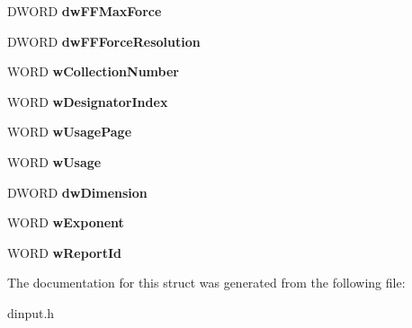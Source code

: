 \begin{DoxyCompactItemize}
\item 
\hypertarget{struct_d_i_d_e_v_i_c_e_o_b_j_e_c_t_i_n_s_t_a_n_c_e_a_a3592d183014f1c2d64ad28bdb27f88ef}{D\-W\-O\-R\-D {\bfseries dw\-F\-F\-Max\-Force}}\label{struct_d_i_d_e_v_i_c_e_o_b_j_e_c_t_i_n_s_t_a_n_c_e_a_a3592d183014f1c2d64ad28bdb27f88ef}

\item 
\hypertarget{struct_d_i_d_e_v_i_c_e_o_b_j_e_c_t_i_n_s_t_a_n_c_e_a_a09065880b51be7eb7a05149bdd096c9d}{D\-W\-O\-R\-D {\bfseries dw\-F\-F\-Force\-Resolution}}\label{struct_d_i_d_e_v_i_c_e_o_b_j_e_c_t_i_n_s_t_a_n_c_e_a_a09065880b51be7eb7a05149bdd096c9d}

\item 
\hypertarget{struct_d_i_d_e_v_i_c_e_o_b_j_e_c_t_i_n_s_t_a_n_c_e_a_af387b174698bc6f9581974e5bbb22ac8}{W\-O\-R\-D {\bfseries w\-Collection\-Number}}\label{struct_d_i_d_e_v_i_c_e_o_b_j_e_c_t_i_n_s_t_a_n_c_e_a_af387b174698bc6f9581974e5bbb22ac8}

\item 
\hypertarget{struct_d_i_d_e_v_i_c_e_o_b_j_e_c_t_i_n_s_t_a_n_c_e_a_ad8c9a9aa5493949ac085ddd966bdb5c9}{W\-O\-R\-D {\bfseries w\-Designator\-Index}}\label{struct_d_i_d_e_v_i_c_e_o_b_j_e_c_t_i_n_s_t_a_n_c_e_a_ad8c9a9aa5493949ac085ddd966bdb5c9}

\item 
\hypertarget{struct_d_i_d_e_v_i_c_e_o_b_j_e_c_t_i_n_s_t_a_n_c_e_a_a321be32a18cddc73a729e0433e529a25}{W\-O\-R\-D {\bfseries w\-Usage\-Page}}\label{struct_d_i_d_e_v_i_c_e_o_b_j_e_c_t_i_n_s_t_a_n_c_e_a_a321be32a18cddc73a729e0433e529a25}

\item 
\hypertarget{struct_d_i_d_e_v_i_c_e_o_b_j_e_c_t_i_n_s_t_a_n_c_e_a_ade26ba2a889dd752d9c3dde6016aad83}{W\-O\-R\-D {\bfseries w\-Usage}}\label{struct_d_i_d_e_v_i_c_e_o_b_j_e_c_t_i_n_s_t_a_n_c_e_a_ade26ba2a889dd752d9c3dde6016aad83}

\item 
\hypertarget{struct_d_i_d_e_v_i_c_e_o_b_j_e_c_t_i_n_s_t_a_n_c_e_a_a6962b084388876cdb1d17d2654f678d8}{D\-W\-O\-R\-D {\bfseries dw\-Dimension}}\label{struct_d_i_d_e_v_i_c_e_o_b_j_e_c_t_i_n_s_t_a_n_c_e_a_a6962b084388876cdb1d17d2654f678d8}

\item 
\hypertarget{struct_d_i_d_e_v_i_c_e_o_b_j_e_c_t_i_n_s_t_a_n_c_e_a_a14b3eb33b41d27931e4e10557c6003b3}{W\-O\-R\-D {\bfseries w\-Exponent}}\label{struct_d_i_d_e_v_i_c_e_o_b_j_e_c_t_i_n_s_t_a_n_c_e_a_a14b3eb33b41d27931e4e10557c6003b3}

\item 
\hypertarget{struct_d_i_d_e_v_i_c_e_o_b_j_e_c_t_i_n_s_t_a_n_c_e_a_a32e311786203d98664aeb6222b63e0d9}{W\-O\-R\-D {\bfseries w\-Report\-Id}}\label{struct_d_i_d_e_v_i_c_e_o_b_j_e_c_t_i_n_s_t_a_n_c_e_a_a32e311786203d98664aeb6222b63e0d9}

\end{DoxyCompactItemize}


The documentation for this struct was generated from the following file\-:\begin{DoxyCompactItemize}
\item 
dinput.\-h\end{DoxyCompactItemize}
